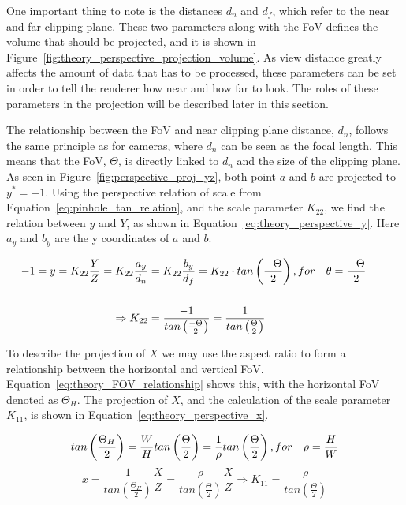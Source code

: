 One important thing to note is the distances $d_n$ and $d_f$, which refer to the near and far clipping plane. These two parameters along with the FoV defines the volume that should be projected, and it is shown in Figure~\ref{fig:theory_perspective_projection_volume}. As view distance greatly affects the amount of data that has to be processed, these parameters can be set in order to tell the renderer how near and how far to look. The roles of these parameters in the projection will be described later in this section.

The relationship between the FoV and near clipping plane distance, $d_n$, follows the same principle as for cameras, where $d_n$ can be seen as the focal length. This means that the FoV, $\Theta$, is directly linked to $d_n$ and the size of the clipping plane. As seen in Figure~\ref{fig:perspective_proj_yz}, both point $a$ and $b$ are projected to $y^*=-1$. Using the perspective relation of scale from Equation~\eqref{eq:pinhole_tan_relation}, and the scale parameter $K_{22}$, we find the relation between $y$ and $Y$, as shown in Equation~\eqref{eq:theory_perspective_y}. Here $a_y$ and $b_y$ are the y coordinates of $a$ and $b$.

\begin{equation}
    \begin{aligned}
        -1 = y = K_{22} \frac{Y}{Z} = K_{22} \frac{a_y}{d_n} &= K_{22} \frac{b_y}{d_f} = K_{22} \cdot tan\left(\frac{-\Theta}{2}\right) \hfil,for \quad \theta = \frac{-\Theta}{2} \\\\
        \Rightarrow K_{22} &= \frac{-1}{tan\left(\frac{-\Theta}{2}\right)} = \frac{1}{tan\left(\frac{\Theta}{2}\right)} &&
        \label{eq:theory_perspective_y}
    \end{aligned}
\end{equation}

To describe the projection of $X$ we may use the aspect ratio to form a relationship between the horizontal and vertical FoV. Equation~\eqref{eq:theory_FOV_relationship} shows this, with the horizontal FoV denoted as $\Theta_H$. The projection of $X$, and the calculation of the scale parameter $K_{11}$, is shown in Equation~\eqref{eq:theory_perspective_x}.


\begin{equation}
    tan\left(\frac{\Theta_H}{2}\right) = \frac{W}{H}tan\left(\frac{\Theta}{2}\right) = \frac{1}{\rho}tan\left(\frac{\Theta}{2}\right) \hfill, for \quad \rho = \frac{H}{W}
    \label{eq:theory_FOV_relationship}
\end{equation}
\begin{equation}
    x = \frac{1}{tan\left(\frac{\Theta_H}{2}\right)}\frac{X}{Z} = \frac{\rho}{tan\left(\frac{\Theta}{2}\right)}\frac{X}{Z} \Rightarrow K_{11} = \frac{\rho}{tan\left(\frac{\Theta}{2}\right)}
    \label{eq:theory_perspective_x}
\end{equation}


